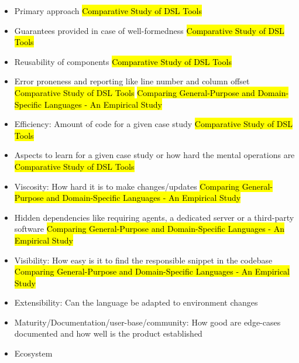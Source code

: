 \begin{itemize}
  \item Primary approach \hl{Comparative Study of DSL Tools}
  \item Guarantees provided in case of well-formedness \hl{Comparative Study of DSL Tools} %
  \item Reusability of components \hl{Comparative Study of DSL Tools}
  \item Error proneness and reporting like line number and column offset \hl{Comparative Study of DSL Tools} \hl{Comparing General-Purpose and Domain-Specific Languages - An Empirical Study}
  \item Efficiency: Amount of code for a given case study \hl{Comparative Study of DSL Tools}
  \item Aspects to learn for a given case study or how hard the mental operations are \hl{Comparative Study of DSL Tools} %
  \item Viscosity: How hard it is to make changes/updates \hl{Comparing General-Purpose and Domain-Specific Languages - An Empirical Study}
  \item Hidden dependencies like requiring agents, a dedicated server or a third-party software \hl{Comparing General-Purpose and Domain-Specific Languages - An Empirical Study}
  \item Visibility: How easy is it to find the responsible snippet in the codebase \hl{Comparing General-Purpose and Domain-Specific Languages - An Empirical Study}
  \item Extensibility: Can the language be adapted to environment changes
  \item Maturity/Documentation/user-base/community: How good are edge-cases documented and how well is the product established
  \item Ecosystem
\end{itemize}


